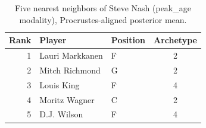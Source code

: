 \begin{table}[htbp]
  \centering\small
  \begin{tabular}{rllc}
    \toprule
    Rank & Player & Position & Archetype \\
    \midrule
    1 & Lauri Markkanen & F & 2 \\
    2 & Mitch Richmond & G & 2 \\
    3 & Louis King & F & 4 \\
    4 & Moritz Wagner & C & 2 \\
    5 & D.J. Wilson & F & 4 \\
    \bottomrule
  \end{tabular}
  \caption{Five nearest neighbors of Steve Nash (peak_age modality), Procrustes-aligned posterior mean.}
  \label{tab:Steve_Nash_neighbors_peak_age}
\end{table}

